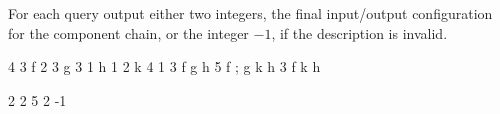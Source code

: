 \begin{formalout}
For each query output either two integers, the final input/output configuration for the component chain, or the integer $-1$, if the description is invalid.
\end{formalout}

\begin{datain}
4 3
f 2 3
g 3 1
h 1 2
k 4 1
3 f g h
5 f ; g k h 
3 f k h
\end{datain}
\begin{dataout}
2 2
5 2
-1
\end{dataout}
